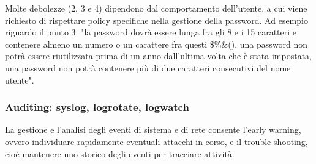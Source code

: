             Molte debolezze (2, 3 e 4) dipendono dal comportamento dell'utente, a cui viene richiesto di rispettare policy specifiche nella gestione della password. Ad esempio riguardo il punto 3: "la password dovrà essere lunga fra gli 8 e i 15 caratteri e contenere almeno un numero o un carattere fra questi \$\%\&(), una password non potrà essere riutilizzata prima di un anno dall'ultima volta che è stata impostata, una password non potrà contenere più di due caratteri consecutivi del nome utente".

        \subsubsection{Auditing: syslog, logrotate, logwatch}
            La gestione e l'analisi degli eventi di sistema e di rete consente l'early warning, ovvero individuare rapidamente eventuali attacchi in corso, e il trouble shooting, cioè mantenere uno storico degli eventi per tracciare attività.
        
